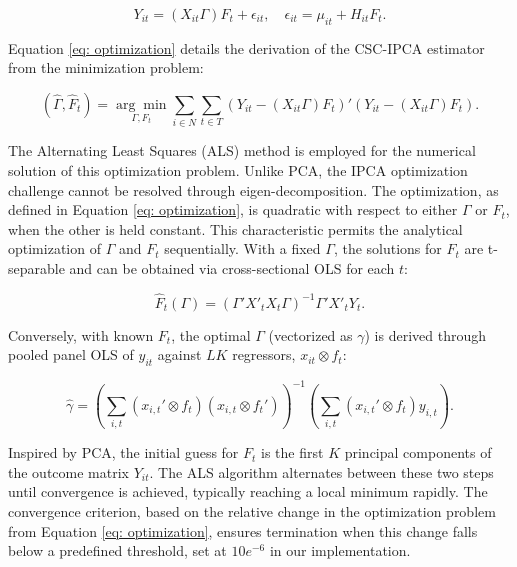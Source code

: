 \documentclass[12pt]{article}
\begin{document}
\begin{equation*}
Y_{it} = (X_{it}\Gamma) F_{t} + \epsilon_{it}, \quad \epsilon_{it} = \mu_{it} + H_{it} F_t.
\end{equation*}

Equation \ref{eq: optimization} details the derivation of the CSC-IPCA estimator from the minimization problem:

\begin{equation*}
(\hat{\Gamma}, \hat{F}_t) = \underset{\Gamma, F_t}{\arg\min} \sum_{i \in N} \sum_{t \in T} \left( Y_{it} - (X_{it}\Gamma) F_{t} \right)' \left( Y_{it} - (X_{it}\Gamma) F_{t} \right).
\end{equation*}

The Alternating Least Squares (ALS) method is employed for the numerical solution of this optimization problem. Unlike PCA, the IPCA optimization challenge cannot be resolved through eigen-decomposition. The optimization, as defined in Equation \ref{eq: optimization}, is quadratic with respect to either $\Gamma$ or $F_t$, when the other is held constant. This characteristic permits the analytical optimization of $\Gamma$ and $F_t$ sequentially. With a fixed $\Gamma$, the solutions for $F_t$ are t-separable and can be obtained via cross-sectional OLS for each $t$:

\begin{equation*}
\hat{F}_t(\Gamma) = (\Gamma' X'_t X_t \Gamma)^{-1} \Gamma' X'_t Y_t.
\end{equation*}

Conversely, with known $F_{t}$, the optimal $\Gamma$ (vectorized as $\gamma$) is derived through pooled panel OLS of $y_{it}$ against $LK$ regressors, $x_{it} \otimes f_t$:

\begin{equation*}
\hat{\gamma} = \left( \sum_{i,t} (x_{i,t}' \otimes f_t) (x_{i,t} \otimes f_t') \right)^{-1} \left( \sum_{i,t} (x_{i,t}' \otimes f_t) y_{i,t} \right).
\end{equation*}

Inspired by PCA, the initial guess for $F_t$ is the first $K$ principal components of the outcome matrix $Y_{it}$. The ALS algorithm alternates between these two steps until convergence is achieved, typically reaching a local minimum rapidly. The convergence criterion, based on the relative change in the optimization problem from Equation \ref{eq: optimization}, ensures termination when this change falls below a predefined threshold, set at $10e^{-6}$ in our implementation.
\end{document}
